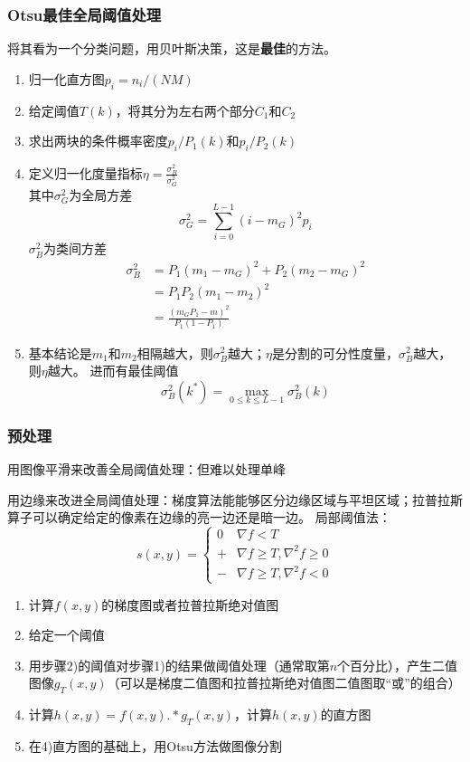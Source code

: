 \subsubsection{Otsu最佳全局阈值处理}
将其看为一个分类问题，用贝叶斯决策，这是\textbf{最佳}的方法。
\begin{enumerate}
\item 归一化直方图$p_i=n_i/(NM)$
\item 给定阈值$T(k)$，将其分为左右两个部分$C_1$和$C_2$
\item 求出两块的条件概率密度$p_i/P_1(k)$和$p_i/P_2(k)$
\item 定义归一化度量指标$\eta=\frac{\sigma_B^2}{\sigma_G^2}$\\
其中$\sigma_G^2$为全局方差
\[\sigma_G^2=\sum_{i=0}^{L-1}(i-m_G)^2p_i\]
$\sigma_B^2$为类间方差
\[\begin{aligned}
\sigma_B^2 &= P_1(m_1-m_G)^2+P_2(m_2-m_G)^2\\
&=P_1P_2(m_1-m_2)^2\\
&=\frac{(m_G P_1-m)^2}{P_1(1-P_1)}
\end{aligned}\]
\item 基本结论是$m_1$和$m_2$相隔越大，则$\sigma_B^2$越大；$\eta$是分割的可分性度量，$\sigma_B^2$越大，则$\eta$越大。
进而有最佳阈值
\[\sigma_B^2(k^*)=\max_{0\leq k\leq L-1}\sigma_B^2(k)\]
\end{enumerate}

\subsubsection{预处理}
用图像平滑来改善全局阈值处理：但难以处理单峰

用边缘来改进全局阈值处理：梯度算法能能够区分边缘区域与平坦区域；拉普拉斯算子可以确定给定的像素在边缘的亮一边还是暗一边。
局部阈值法：
\[s(x,y)=\begin{cases}
0 & \nabla f<T\\
+ & \nabla f\geq T, \nabla^2 f\geq 0\\
- & \nabla f\geq T, \nabla^2 f< 0
\end{cases}\]
\begin{enumerate}
	\item 计算$f(x,y)$的梯度图或者拉普拉斯绝对值图
	\item 给定一个阈值
	\item 用步骤2)的阈值对步骤1)的结果做阈值处理（通常取第$n$个百分比），产生二值图像$g_T(x,y)$（可以是梯度二值图和拉普拉斯绝对值图二值图取“或”的组合）
	\item 计算$h(x,y)=f(x,y).*g_T(x,y)$，计算$h(x,y)$的直方图
	\item 在4)直方图的基础上，用Otsu方法做图像分割
\end{enumerate}

